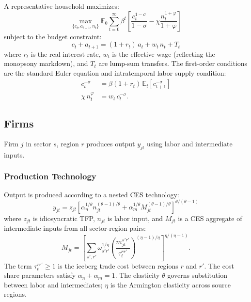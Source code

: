 A representative household maximizes:
\begin{equation}
  \max_{\{c_t, a_{t+1}, n_t\}} \mathbb{E}_0 \sum_{t=0}^{\infty} \beta^t
  \left[\frac{c_t^{1-\sigma}}{1-\sigma} - \chi \frac{n_t^{1+\varphi}}{1+\varphi}\right]
  \label{eq:hh_objective}
\end{equation}
subject to the budget constraint:
\begin{equation}
  c_t + a_{t+1} = (1 + r_t)\,a_t + w_t\,n_t + T_t
  \label{eq:bc}
\end{equation}
where $r_t$ is the real interest rate, $w_t$ is the effective wage
(reflecting the monopsony markdown), and $T_t$ are lump-sum transfers.
The first-order conditions are the standard Euler equation and
intratemporal labor supply condition:
\begin{align}
  c_t^{-\sigma} &= \beta(1+r_t)\,\mathbb{E}_t[c_{t+1}^{-\sigma}]
  \label{eq:euler} \\
  \chi\,n_t^{\varphi} &= w_t\,c_t^{-\sigma}.
  \label{eq:labor_supply_hh}
\end{align}

\subsection{Firms}
\label{sec:firms}

Firm $j$ in sector $s$, region $r$ produces output $y_{jt}$ using labor and
intermediate inputs.

\subsubsection{Production Technology}

Output is produced according to a nested CES technology:
\begin{equation}
  y_{jt} = z_{jt} \left[\alpha_n^{1/\theta} n_{jt}^{(\theta-1)/\theta} +
  \alpha_m^{1/\theta} M_{jt}^{(\theta-1)/\theta}\right]^{\theta/(\theta-1)}
  \label{eq:production}
\end{equation}
where $z_{jt}$ is idiosyncratic TFP, $n_{jt}$ is labor input, and
$M_{jt}$ is a CES aggregate of intermediate inputs from all sector-region
pairs:
\begin{equation}
  M_{jt} = \left[\sum_{s',r'} \omega_{s'r'}^{1/\eta}
  \left(\frac{m_{jt}^{s'r'}}{\tau_t^{rr'}}\right)^{(\eta-1)/\eta}
  \right]^{\eta/(\eta-1)}.
  \label{eq:composite_M}
\end{equation}
The term $\tau_t^{rr'} \geq 1$ is the iceberg trade cost between regions
$r$ and $r'$. The cost share parameters satisfy
$\alpha_n + \alpha_m = 1$. The elasticity $\theta$ governs substitution
between labor and intermediates; $\eta$ is the Armington elasticity across
source regions.


